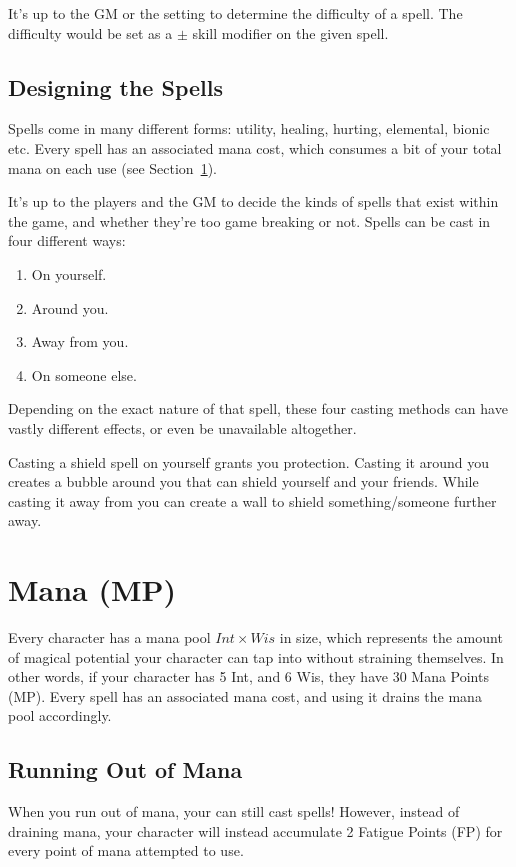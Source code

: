 \begin{note} 
  It's up to the GM or the setting to determine the difficulty of a spell.
  The difficulty would be set as a $\pm$ skill modifier on the given spell.
\end{note}

\subsection{Designing the Spells}
Spells come in many different forms: utility, healing, hurting, elemental, bionic etc.
Every spell has an associated mana cost, which consumes a bit of your total mana on each use (see Section~\ref{sec:mana}).

It's up to the players and the GM to decide the kinds of spells that exist within the game, and whether they're too game breaking or not.
Spells can be cast in four different ways:
\begin{enumerate}
  \item On yourself.
  \item Around you.
  \item Away from you.
  \item On someone else.
\end{enumerate}
Depending on the exact nature of that spell, these four casting methods can have vastly different effects, or even be unavailable altogether.

\begin{example} 
  Casting a shield spell on yourself grants you protection.
  Casting it around you creates a bubble around you that can shield yourself and your friends.
  While casting it away from you can create a wall to shield something/someone further away.
\end{example}

\section{Mana (MP)}\label{sec:mana}
Every character has a mana pool $Int \times Wis$ in size, which represents the amount of magical potential your character can tap into without straining themselves.
In other words, if your character has 5 Int, and 6 Wis, they have 30 Mana Points (MP).
Every spell has an associated mana cost, and using it drains the mana pool accordingly.

\subsection{Running Out of Mana}
When you run out of mana, your can still cast spells!
However, instead of draining mana, your character will instead accumulate 2 Fatigue Points (FP) for every point of mana attempted to use.


